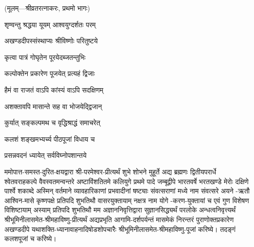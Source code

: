 
\centerline{\small{(मूलम्—श्रीव्रतरत्नाकरः, प्रथमो भागः)}}



{शृण्वन्तु श्रद्धया यूयम् आश्वयुग्दर्शतः परम्}

{अखण्डदीपस्संस्थाप्यः श्रीविष्णोः परितुष्टये}

{कृत्वा पात्रं गोघृतेन पूरयेदब्जतन्तुभिः}

{कल्पोक्तेन प्रकारेण पूजयेत् प्रत्यहं द्विजाः}

{हैमं वा राजतं वाऽपि कांस्यं वाऽपि सदक्षिणम्}

{अशक्तावपि मासान्ते सह वा भोजयेद्द्विजान्}

{कुर्यात् सङ्कल्पमथ च वृद्धिश्राद्धं समाचरेत्}

{कलशं शङ्खमभ्यर्च्य पीठपूजां विधाय च}





{प्रसन्नवदनं ध्यायेत् सर्वविघ्नोपशान्तये}


ममोपात्त-समस्त-दुरित-क्षयद्वारा श्री-परमेश्वर-प्रीत्यर्थं शुभे शोभने मुहूर्ते अद्य ब्रह्मणः
द्वितीयपरार्धे श्वेतवराहकल्पे वैवस्वतमन्वन्तरे अष्टाविंशतितमे कलियुगे प्रथमे पादे
जम्बूद्वीपे भारतवर्षे भरतखण्डे मेरोः दक्षिणे पार्श्वे शकाब्दे अस्मिन् वर्तमाने व्यावहारिकाणां
प्रभवादीनां षष्ट्याः संवत्सराणां मध्ये \blank{} नाम संवत्सरे \blank{} अयने
\blank{}-ऋतौ आश्विन-मासे कृष्णपक्षे प्रतिपदि शुभतिथौ \blank{} वासरयुक्तायाम्
\blank{} नक्षत्र \blank{} नाम योगे
\blank{}-करण-युक्तायां च एवं गुण विशेषण विशिष्टायाम्
अस्याम् प्रतिपदि शुभतिथौ मम अज्ञाननिवृत्तिद्वारा सुज्ञानसिद्ध्यर्थं परलोके अन्धत्वनिवृत्त्यर्थं
श्रीभूमिनीलासमेत-श्रीमहाविष्णु-प्रीत्यर्थं अद्यप्रभृति आगामि-दर्शपर्यन्तं मासमेकं निरन्तरं
पुराणोक्तप्रकारेण अखण्डदीपे यथाशक्ति-ध्यानावाहनादिषोडशोपचारैः
श्रीभूमिनीलासमेत-श्रीमहाविष्णु-पूजां करिष्ये। तदङ्गं कलशपूजां च करिष्ये।

